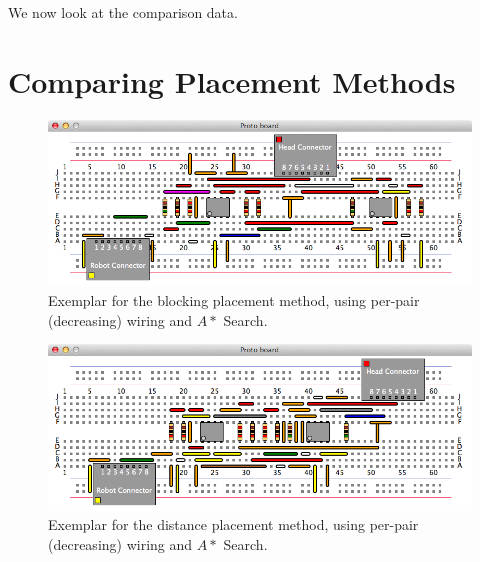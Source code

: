 We now look at the comparison data.

\section{Comparing Placement Methods}
\label{sec:compare_placement}

\begin{figure}[H]
\begin{center}
\includegraphics[width=\textwidth]{Images/exemplar_per_pair_decreasing.png}
\caption[Blocking method exemplar]{Exemplar for the blocking placement method,
using per-pair (decreasing) wiring and $A*$ Search.}
\end{center}
\end{figure}

\begin{figure}[H]
\begin{center}
\includegraphics[width=\textwidth]{Images/exemplar_distance.png}
\caption[Distance method exemplar]{Exemplar for the distance placement method,
using per-pair (decreasing) wiring and $A*$ Search.}
\end{center}
\end{figure}

